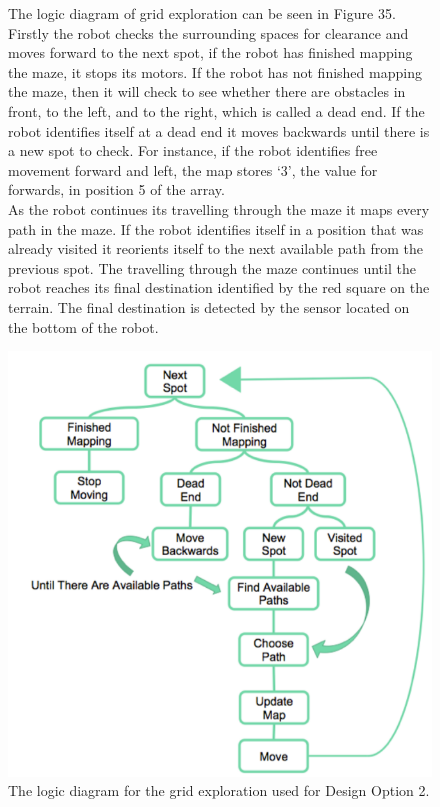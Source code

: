 \documentclass[a4paper]{article}
\begin{document}
\begin{figure}
\begin{minipage}{0.45\textwidth}
The logic diagram of grid exploration can be seen in Figure 35. Firstly the robot checks the surrounding spaces for clearance and moves forward to the next spot, if the robot has finished mapping the maze, it stops its motors. If the robot has not finished mapping the maze, then it will check to see whether there are obstacles in front, to the left, and to the right, which is called a dead end. If the robot identifies itself at a dead end it moves backwards until there is a new spot to check. For instance, if the robot identifies free movement forward and left, the map stores ‘3’, the value for forwards, in position 5 of the array.\\

As the robot continues its travelling through the maze it maps every path in the maze. If the robot identifies itself in a position that was already visited it reorients itself to the next available path from the previous spot. The travelling through the maze continues until the robot reaches its final destination identified by the red square on the terrain. The final destination is detected by the sensor located on the bottom of the robot.
\vspace{0.5cm}
\end{minipage}
\hspace{0.5cm}
\begin{minipage}{0.45\textwidth}
\centering
\includegraphics[scale=0.35]{flow_option2}
\caption{The logic diagram for the grid exploration used for Design Option 2.}
\end{minipage}
\end{figure}
\end{document}
